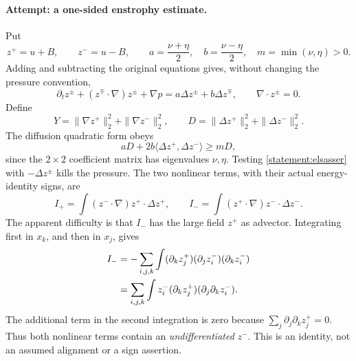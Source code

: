 \documentclass[11pt,a4paper]{article}
\numberwithin{equation}{section}
\begin{document}
\paragraph{Attempt: a one-sided enstrophy estimate.}
Put
\[
 z^+=u+B,\qquad z^-=u-B,\qquad
 a=\frac{\nu+\eta}{2},\quad b=\frac{\nu-\eta}{2},\quad
 m=\min(\nu,\eta)>0.
\]
Adding and subtracting the original equations gives, without changing the
pressure convention,
\begin{equation}\label{statement:elsasser}
 \partial_tz^\pm+(z^\mp\cdot\nabla)z^\pm+\nabla p
 =a\Delta z^\pm+b\Delta z^\mp,
 \qquad \nabla\cdot z^\pm=0.
\end{equation}
Define
\[
 Y=\|\nabla z^+\|_2^2+\|\nabla z^-\|_2^2,\qquad
 D=\|\Delta z^+\|_2^2+\|\Delta z^-\|_2^2.
\]
The diffusion quadratic form obeys
\begin{equation}\label{statement:diffusion}
 aD+2b\langle\Delta z^+,\Delta z^-\rangle\geq mD,
\end{equation}
since the $2\times2$ coefficient matrix has eigenvalues $\nu,\eta$.
Testing \eqref{statement:elsasser} with $-\Delta z^\pm$ kills the pressure.
The two nonlinear terms, with their actual energy-identity signs, are
\[
 I_+=\int (z^-\cdot\nabla)z^+\cdot\Delta z^+,
 \qquad I_-=\int (z^+\cdot\nabla)z^-\cdot\Delta z^-.
\]
The apparent difficulty is that $I_-$ has the large field $z^+$ as
advector. Integrating first in $x_k$, and then in $x_j$, gives
\begin{align}
 I_-&=-\sum_{i,j,k}\int
       (\partial_k z^+_j)(\partial_j z^-_i)(\partial_k z^-_i)
       \notag\\
 &=\sum_{i,j,k}\int z^-_i(\partial_k z^+_j)
                         (\partial_j\partial_k z^-_i).
 \label{statement:cancellation}
\end{align}
The additional term in the second integration is zero because
$\sum_j\partial_j\partial_k z^+_j=0$. Thus both nonlinear terms contain
an \emph{undifferentiated} $z^-$. This is an identity, not an assumed
alignment or a sign assertion.
\end{document}
